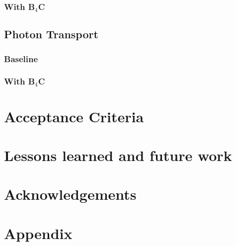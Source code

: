 \documentclass[12pt]{article}
\begin{document}
\subsubsection{With B$_4$C}
\subsection{Photon Transport}
\subsubsection{Baseline}
\subsubsection{With B$_4$C}

\section{Acceptance Criteria}
\section{Lessons learned and future work}
\section{Acknowledgements}



\newpage
\section{Appendix}

\end{document}
